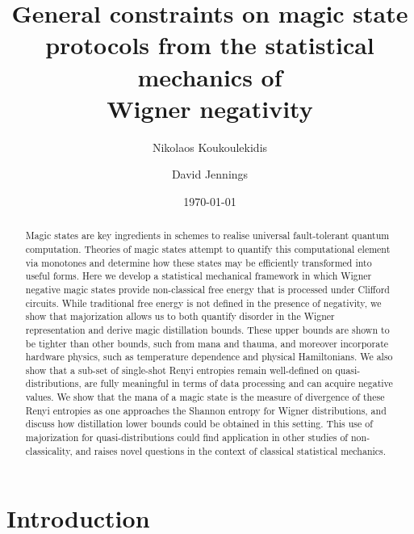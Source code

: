 \documentclass[pra,
aps,
twocolumn,
superscriptaddress,
groupedaddress,
nofootinbib,
reprint
]{revtex4-1}
\begin{document}
\begin{abstract}
Magic states are key ingredients in schemes to realise universal fault-tolerant quantum computation.
Theories of magic states attempt to quantify this computational element via monotones and determine how these states may be efficiently transformed into useful forms. Here we develop a statistical mechanical framework in which Wigner negative magic states provide non-classical free energy that is processed under Clifford circuits. While traditional free energy is not defined in the presence of negativity, we show that majorization allows us to both quantify disorder in the Wigner representation and derive magic distillation bounds. These upper bounds are shown to be tighter than other bounds, such from mana and thauma, and moreover incorporate hardware physics, such as temperature dependence and physical Hamiltonians. We also show that a sub-set of single-shot Renyi entropies remain well-defined on quasi-distributions, are fully meaningful in terms of data processing and can acquire negative values. We show that the mana of a magic state is the measure of divergence of these Renyi entropies as one approaches the Shannon entropy for Wigner distributions, and discuss how distillation lower bounds could be obtained in this setting. This use of majorization for quasi-distributions could find application in other studies of non-classicality, and raises novel questions in the context of classical statistical mechanics.
\end{abstract}


\title{General constraints on magic state protocols from the statistical mechanics of \\Wigner negativity}

\author{Nikolaos Koukoulekidis}
\author{David Jennings}

\date{\today}
\maketitle


\section{Introduction}
\label{sec:intro}
\end{document}
